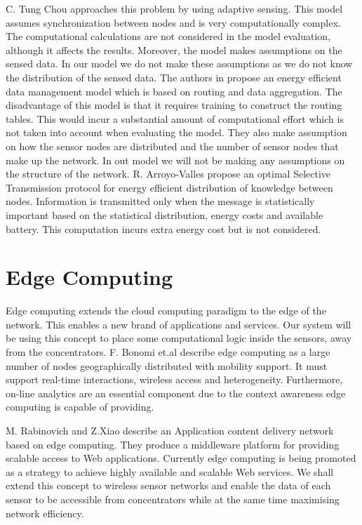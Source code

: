 \documentclass{mproj}
\begin{document}
C. Tung Chou \cite{informationCollection} approaches this problem by using adaptive sensing. This model assumes synchronization between nodes and is very computationally complex. The computational calculations are not considered in the model evaluation, although it affects the results. Moreover, the model makes assumptions on the sensed data. In our model we do not make these assumptions as we do not know the distribution of the sensed data. The authors in \cite{energyEfficientDataManagement} propose an energy efficient data management model which is based on routing and data aggregation. The disadvantage of this model is that it requires training to construct the routing tables. This would incur a substantial amount of computational effort which is not taken into account when evaluating the model. They also make assumption on how the sensor nodes are distributed and the number of sensor nodes that make up the network. In out model we will not be making any assumptions on the structure of the network. R. Arroyo-Valles \cite{optimalSelective} propose an optimal Selective Transmission protocol for energy efficient distribution of knowledge between nodes. Information is transmitted only when the message is statistically important based on the statistical distribution, energy costs and available battery. This computation incurs extra energy cost but is not considered.

\cite{distributedEnergyDistribution}
\cite{surveyMilitary}
\cite{SmartSensorWeb}

\section{Edge Computing}
Edge computing extends the cloud computing paradigm to the edge of the network. This enables a new brand of applications and services. Our system will be using this concept to place some computational logic inside the sensors, away from the concentrators. F. Bonomi et.al \cite{fogComputing} describe edge computing as a large number of nodes geographically distributed with mobility support. It must support real-time interactions, wireless access and heterogeneity. Furthermore, on-line analytics are an essential component due to the context awareness edge computing is capable of providing. 

M. Rabinovich and Z.Xiao \cite{replicatingInternetApplications} describe an Application content delivery network based on edge computing. They produce a middleware platform for providing scalable access to Web applications. Currently edge computing is being promoted as a strategy to achieve highly available and scalable Web services. \cite{authenticatingQueries} We shall extend this concept to wireless sensor networks and enable the data of each sensor to be accessible from concentrators while at the same time maximising network efficiency.
\end{document}
